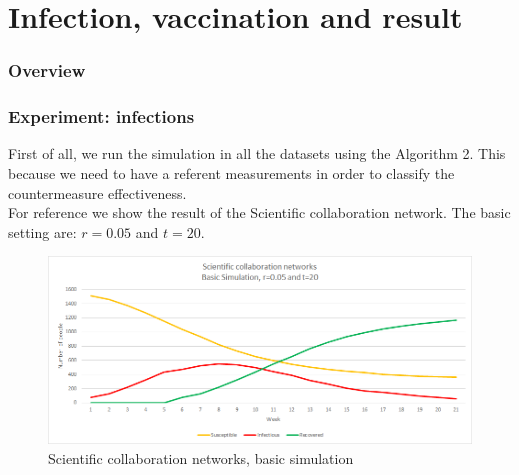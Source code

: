 \documentclass{beamer}
\begin{document}
\section{Infection, vaccination and result}

\begin{frame}
\frametitle{Overview} %
\tableofcontents[currentsection] %
\end{frame}

\begin{frame}
\frametitle{Experiment: infections}
First of all, we run the simulation in all the datasets using the Algorithm 2. This because we need to have a referent measurements in order to classify the countermeasure effectiveness. \\
For reference we show the result of the Scientific collaboration network. The basic setting are: $r=0.05$ and $t=20$.

\begin{figure}[H]\label{fig:scie_sir}
\centering	
\includegraphics[scale=0.4]{img/Scientific_basic.png}
\caption{Scientific collaboration networks, basic simulation}
\end{figure} 

\end{frame}
\end{document}
